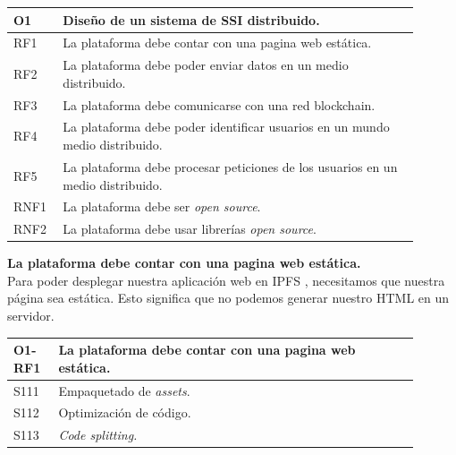 \begin{center}
    \begin{table}[h!]
        \begin{tabular}{|p{0.1\linewidth} | p{0.8\linewidth}|}
            \hline
            \rowcolor{Gray} 
            \textbf{O1} & \textbf{Diseño de un sistema de SSI distribuido.} \\
            \hline
            RF1         & La plataforma debe contar con una pagina web estática. \\
            \hline
            RF2         & La plataforma debe poder enviar datos en un medio distribuido. \\
            \hline
            RF3         & La plataforma debe comunicarse con una red blockchain. \\
            \hline
            RF4         & La plataforma debe poder identificar usuarios en un mundo medio distribuido. \\
            \hline
            RF5         & La plataforma debe procesar peticiones de los usuarios en un medio distribuido. \\
            \hline
            RNF1        & La plataforma debe ser \textit{open source}. \\
            \hline
            RNF2        & La plataforma debe usar librerías \textit{open source}. \\
            \hline
        \end{tabular}
    \end{table}
\end{center}
\textbf{La plataforma debe contar con una pagina web estática.}\\
Para poder desplegar nuestra aplicación web en IPFS \cite{web:ipfs}, necesitamos que nuestra página sea estática. Esto significa que no podemos generar nuestro HTML en un servidor.
\begin{center}
    \begin{table}[h!]
        \begin{tabular}{|p{0.1\linewidth} | p{0.8\linewidth}|}
            \hline
            \rowcolor{Gray} 
            \textbf{O1-RF1} & \textbf{La plataforma debe contar con una pagina web estática.} \\
            \hline
            S111            & Empaquetado de \textit{assets}. \\
            \hline
            S112            & Optimización de código. \\
            \hline
            S113            & \textit{Code splitting.} \\
            \hline
        \end{tabular}
    \end{table}
\end{center}
